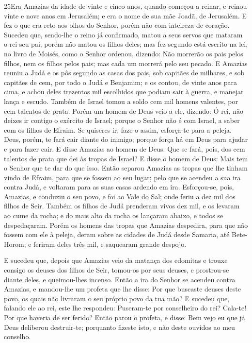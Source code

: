 \lettrine{25} Era Amazias da idade de vinte e cinco anos,
quando começou a reinar, e reinou vinte e nove anos em Jerusalém; e
era o nome de sua mãe Joadã, de Jerusalém. E fez o que era reto
aos olhos do Senhor, porém não com inteireza de coração. Sucedeu
que, sendo-lhe o reino já confirmado, matou a seus servos que
mataram o rei seu pai; porém não matou os filhos deles; mas fez
segundo está escrito na lei, no livro de Moisés, como o Senhor
ordenou, dizendo: Não morrerão os pais pelos filhos, nem os filhos
pelos pais; mas cada um morrerá pelo seu pecado. E Amazias
reuniu a Judá e os pôs segundo as casas dos pais, sob capitães de
milhares, e sob capitães de cem, por todo o Judá e Benjamim; e os
contou, de vinte anos para cima, e achou deles trezentos mil
escolhidos que podiam sair à guerra, e manejar lança e escudo.
Também de Israel tomou a soldo cem mil homens valentes, por cem
talentos de prata. Porém um homem de Deus veio a ele, dizendo: Ó
rei, não deixes ir contigo o exército de Israel; porque o Senhor não
é com Israel, a saber com os filhos de Efraim. Se quiseres ir,
faze-o assim, esforça-te para a peleja. Deus, porém, te fará cair
diante do inimigo; porque força há em Deus para ajudar e para fazer
cair. E disse Amazias ao homem de Deus: Que se fará, pois, dos
cem talentos de prata que dei às tropas de Israel? E disse o homem
de Deus: Mais tem o Senhor que te dar do que isso. Então
separou Amazias as tropas que lhe tinham vindo de Efraim, para que
se fossem ao seu lugar; pelo que se acendeu a sua ira contra Judá, e
voltaram para as suas casas ardendo em ira. Esforçou-se,
pois, Amazias, e conduziu o seu povo, e foi ao Vale do Sal; onde
feriu a dez mil dos filhos de Seir. Também os filhos de Judá
prenderam vivos dez mil, e os levaram ao cume da rocha; e do mais
alto da rocha os lançaram abaixo, e todos se despedaçaram.
Porém os homens das tropas que Amazias despedira, para que
não fossem com ele à peleja, deram sobre as cidades de Judá desde
Samaria, até Bete-Horom; e feriram deles três mil, e saquearam
grande despojo.

E sucedeu que, depois que Amazias veio da matança dos edomitas e
trouxe consigo os deuses dos filhos de Seir, tomou-os por seus
deuses, e prostrou-se diante deles, e queimou-lhes incenso.
Então a ira do Senhor se acendeu contra Amazias, e mandou-lhe
um profeta que lhe disse: Por que buscaste deuses deste povo, os
quais não livraram o seu próprio povo da tua mão? E sucedeu
que, falando ele ao rei, este lhe respondeu: Puseram-te por
conselheiro do rei? Cala-te! Por que haveria de ser ferido? Então
parou o profeta, e disse: Bem vejo eu que já Deus deliberou
destruir-te; porquanto fizeste isto, e não deste ouvidos ao meu
conselho.

